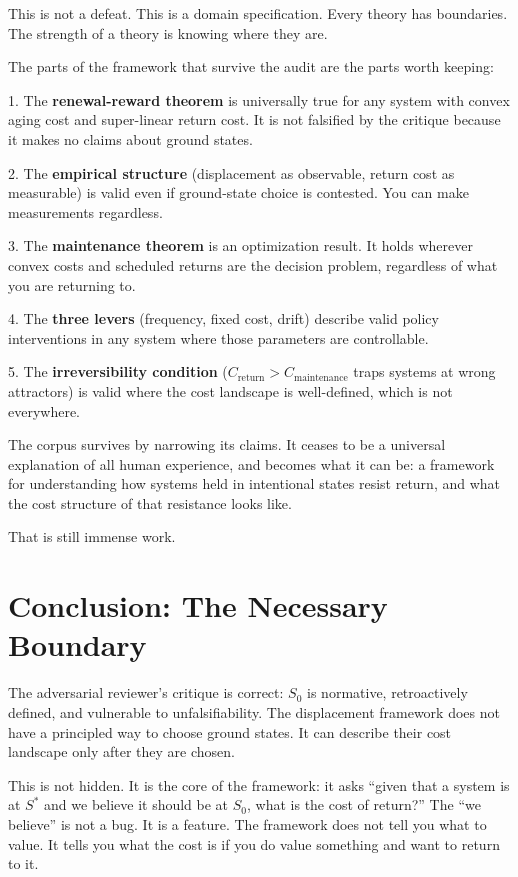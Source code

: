 \documentclass[12pt]{article}
\begin{document}
This is not a defeat. This is a domain specification. Every theory has boundaries. The strength of a theory is knowing where they are.

The parts of the framework that survive the audit are the parts worth keeping:

1. The \textbf{renewal-reward theorem} is universally true for any system with convex aging cost and super-linear return cost. It is not falsified by the critique because it makes no claims about ground states.

2. The \textbf{empirical structure} (displacement as observable, return cost as measurable) is valid even if ground-state choice is contested. You can make measurements regardless.

3. The \textbf{maintenance theorem} is an optimization result. It holds wherever convex costs and scheduled returns are the decision problem, regardless of what you are returning to.

4. The \textbf{three levers} (frequency, fixed cost, drift) describe valid policy interventions in any system where those parameters are controllable.

5. The \textbf{irreversibility condition} ($C_{\text{return}} > C_{\text{maintenance}}$ traps systems at wrong attractors) is valid where the cost landscape is well-defined, which is not everywhere.

The corpus survives by narrowing its claims. It ceases to be a universal explanation of all human experience, and becomes what it can be: a framework for understanding how systems held in intentional states resist return, and what the cost structure of that resistance looks like.

That is still immense work.

\section{Conclusion: The Necessary Boundary}

The adversarial reviewer's critique is correct: $S_0$ is normative, retroactively defined, and vulnerable to unfalsifiability. The displacement framework does not have a principled way to choose ground states. It can describe their cost landscape only after they are chosen.

This is not hidden. It is the core of the framework: it asks ``given that a system is at $S^*$ and we believe it should be at $S_0$, what is the cost of return?'' The ``we believe'' is not a bug. It is a feature. The framework does not tell you what to value. It tells you what the cost is if you do value something and want to return to it.
\end{document}
